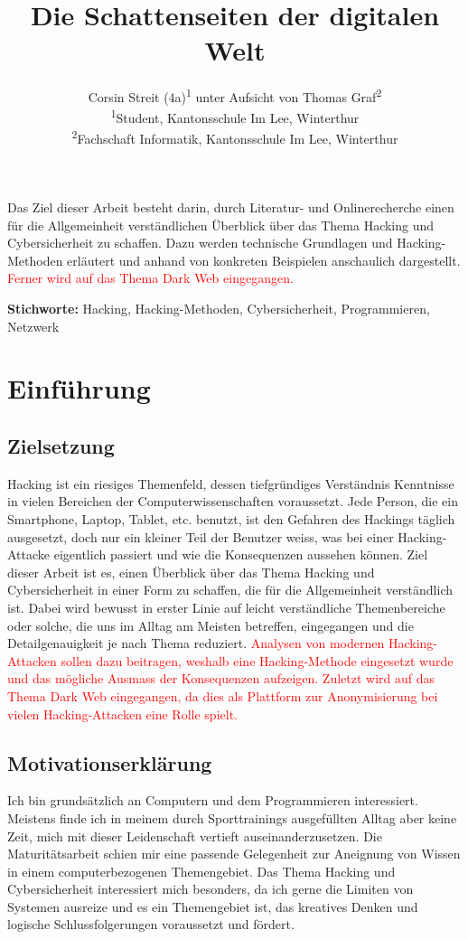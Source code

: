 \documentclass[11pt, a4paper]{article}
\title{\articletype{Hacking und Cybersicherheit} Die Schattenseiten der digitalen Welt}
\author{Corsin Streit (4a)\textsuperscript{1} unter Aufsicht von Thomas Graf\textsuperscript{2} \\
{\footnotesize \textsuperscript{1}Student, Kantonsschule Im Lee, Winterthur} \\
{\footnotesize \textsuperscript{2}Fachschaft Informatik, Kantonsschule Im Lee, Winterthur} \\
}
\date{
	\vspace{12pt}
	\begin{flushleft}
		\normalsize Winterthur, 6. Januar 2025
	\end{flushleft}
}
\renewenvironment{abstract}
  {\begin{mdframed}[
    backgroundcolor=gray!20, 
    innertopmargin=10pt, 
    innerbottommargin=15pt, 
    innerleftmargin=15pt, 
    innerrightmargin=15pt, 
    linewidth=0pt, 
    roundcorner=0pt,
    frametitleaboveskip=5mm, 
    frametitlebelowskip=-1mm, 
    frametitle={\bfseries Abstrakt}, 
    frametitlefont={\bfseries},
    frametitlealignment=\raggedright
    ]
   \vspace{2mm}}
  {\end{mdframed}}
\newcommand{\keywords}[1]{
  \vspace{12pt} 
  \par\noindent\textbf{Stichworte:} #1
}
\begin{document}
\maketitle
\thispagestyle{firstpage}


\begin{abstract}
Das Ziel dieser Arbeit besteht darin, durch Literatur- und Onlinerecherche einen für die Allgemeinheit verständlichen Überblick über das Thema Hacking und Cybersicherheit zu schaffen. Dazu werden technische Grundlagen und Hacking-Methoden erläutert und anhand von konkreten Beispielen anschaulich dargestellt. \textcolor{red}{Ferner wird auf das Thema Dark Web eingegangen.}
\end{abstract}

\keywords{Hacking, Hacking-Methoden, Cybersicherheit, Programmieren, Netzwerk}

\newpage
\hypersetup{linkcolor=black}
\tableofcontents
\hypersetup{linkcolor=RoyalBlue}
\newpage

\section{Einführung}
\subsection{Zielsetzung}
Hacking ist ein riesiges Themenfeld, dessen tiefgründiges Verständnis Kenntnisse in vielen Bereichen der Computerwissenschaften voraussetzt. Jede Person, die ein Smartphone, Laptop, Tablet, etc. benutzt, ist den Gefahren des Hackings täglich ausgesetzt, doch nur ein kleiner Teil der Benutzer weiss, was bei einer Hacking-Attacke eigentlich passiert und wie die Konsequenzen aussehen können. Ziel dieser Arbeit ist es, einen Überblick über das Thema Hacking und Cybersicherheit in einer Form zu schaffen, die für die Allgemeinheit verständlich ist. Dabei wird bewusst in erster Linie auf leicht verständliche Themenbereiche oder solche, die uns im Alltag am Meisten betreffen, eingegangen und die Detailgenauigkeit je nach Thema reduziert. \textcolor{red}{Analysen von modernen Hacking-Attacken sollen dazu beitragen, weshalb eine Hacking-Methode eingesetzt wurde und das mögliche Ausmass der Konsequenzen aufzeigen. Zuletzt wird auf das Thema Dark Web eingegangen, da dies als Plattform zur Anonymisierung bei vielen Hacking-Attacken eine Rolle spielt.}

\subsection{Motivationserklärung}
Ich bin grundsätzlich an Computern und dem Programmieren interessiert. Meistens finde ich in meinem durch Sporttrainings ausgefüllten Alltag aber keine Zeit, mich mit dieser Leidenschaft vertieft auseinanderzusetzen. Die Maturitätsarbeit schien mir eine passende Gelegenheit zur Aneignung von Wissen in einem computerbezogenen Themengebiet. Das Thema Hacking und Cybersicherheit interessiert mich besonders, da ich gerne die Limiten von Systemen ausreize und es ein Themengebiet ist, das kreatives Denken und logische Schlussfolgerungen voraussetzt und fördert.
\end{document}
